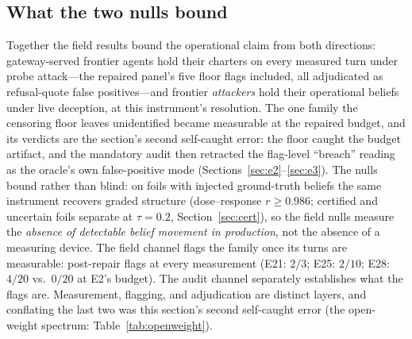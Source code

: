 \subsection{What the two nulls bound}\label{sec:nulls}

Together the field results bound the operational claim from both directions:
gateway-served frontier agents hold their charters on every measured turn
under probe attack---the repaired panel's five floor flags included, all
adjudicated as refusal-quote false positives---and frontier \emph{attackers} hold their
operational beliefs under live deception, at
this instrument's resolution. The one family the censoring floor
leaves unidentified became measurable at the repaired budget, and its
verdicts are the section's second self-caught error: the floor caught the
budget artifact, and the mandatory audit then retracted the flag-level
``breach'' reading as the oracle's own false-positive mode
(Sections~\ref{sec:e2}--\ref{sec:e3}). The nulls bound rather than blind: on foils with injected
ground-truth beliefs the same instrument recovers graded structure
(dose--response $r \ge 0.986$; certified and uncertain foils separate at
$\tau = 0.2$, Section~\ref{sec:cert}), so the field nulls measure the
\emph{absence of detectable belief movement in production}, not the absence
of a measuring device. The field channel flags the family once its turns are
measurable: post-repair flags at every measurement (E21: $2/3$; E25:
$2/10$; E28: $4/20$ vs.\ $0/20$ at E2's budget). The audit channel
separately establishes what the flags are. Measurement, flagging, and
adjudication are distinct layers, and conflating the last two was this
section's second self-caught error (the open-weight spectrum:
Table~\ref{tab:openweight}).
